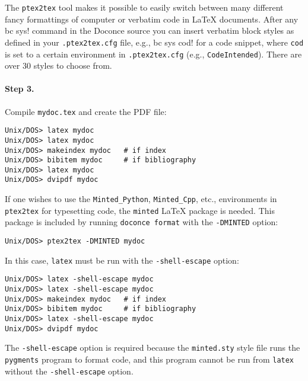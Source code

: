 \documentclass{article}
\begin{document}
The {\fontsize{10pt}{10pt}\verb!ptex2tex!} tool makes it possible to easily switch between many
different fancy formattings of computer or verbatim code in {\LaTeX}
documents. After any {\fontsize{10pt}{10pt}\verb!!bc sys!} command in the Doconce source you can
insert verbatim block styles as defined in your {\fontsize{10pt}{10pt}\verb!.ptex2tex.cfg!}
file, e.g., {\fontsize{10pt}{10pt}\verb!!bc sys cod!} for a code snippet, where {\fontsize{10pt}{10pt}\verb!cod!} is set to
a certain environment in {\fontsize{10pt}{10pt}\verb!.ptex2tex.cfg!} (e.g., {\fontsize{10pt}{10pt}\verb!CodeIntended!}).
There are over 30 styles to choose from.

\paragraph{Step 3.}
Compile {\fontsize{10pt}{10pt}\verb!mydoc.tex!}
and create the PDF file:
\vspace{4pt}
\begin{Verbatim}[numbers=none,frame=lines,label=\fbox{{\tiny Terminal}},fontsize=\fontsize{9pt}{9pt},
labelposition=topline,framesep=2.5mm,framerule=0.7pt]
Unix/DOS> latex mydoc
Unix/DOS> latex mydoc
Unix/DOS> makeindex mydoc   # if index
Unix/DOS> bibitem mydoc     # if bibliography
Unix/DOS> latex mydoc
Unix/DOS> dvipdf mydoc
\end{Verbatim}
If one wishes to use the {\fontsize{10pt}{10pt}\verb!Minted_Python!}, {\fontsize{10pt}{10pt}\verb!Minted_Cpp!}, etc., environments
in {\fontsize{10pt}{10pt}\verb!ptex2tex!} for typesetting code, the {\fontsize{10pt}{10pt}\verb!minted!} {\LaTeX} package is needed.
This package is included by running {\fontsize{10pt}{10pt}\verb!doconce format!} with the
{\fontsize{10pt}{10pt}\verb!-DMINTED!} option:
\vspace{4pt}
\begin{Verbatim}[numbers=none,frame=lines,label=\fbox{{\tiny Terminal}},fontsize=\fontsize{9pt}{9pt},
labelposition=topline,framesep=2.5mm,framerule=0.7pt]
Unix/DOS> ptex2tex -DMINTED mydoc
\end{Verbatim}
In this case, {\fontsize{10pt}{10pt}\verb!latex!} must be run with the
{\fontsize{10pt}{10pt}\verb!-shell-escape!} option:
\vspace{4pt}
\begin{Verbatim}[numbers=none,frame=lines,label=\fbox{{\tiny Terminal}},fontsize=\fontsize{9pt}{9pt},
labelposition=topline,framesep=2.5mm,framerule=0.7pt]
Unix/DOS> latex -shell-escape mydoc
Unix/DOS> latex -shell-escape mydoc
Unix/DOS> makeindex mydoc   # if index
Unix/DOS> bibitem mydoc     # if bibliography
Unix/DOS> latex -shell-escape mydoc
Unix/DOS> dvipdf mydoc
\end{Verbatim}
The {\fontsize{10pt}{10pt}\verb!-shell-escape!} option is required because the {\fontsize{10pt}{10pt}\verb!minted.sty!} style
file runs the {\fontsize{10pt}{10pt}\verb!pygments!} program to format code, and this program
cannot be run from {\fontsize{10pt}{10pt}\verb!latex!} without the {\fontsize{10pt}{10pt}\verb!-shell-escape!} option.
\end{document}
